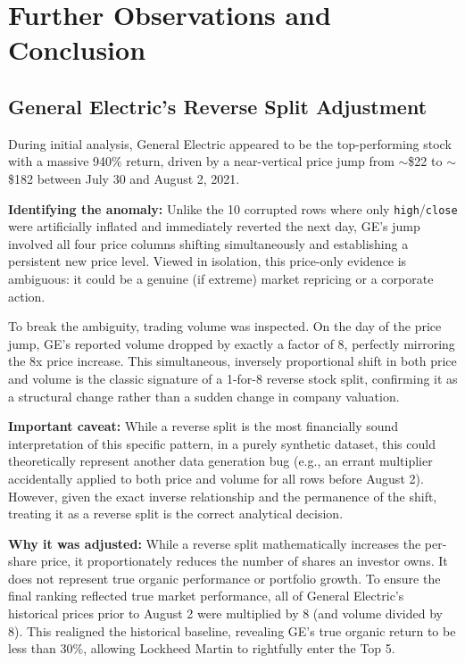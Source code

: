 \chapter{Further Observations and Conclusion}
\label{chap:observations}

\section{General Electric's Reverse Split Adjustment}
\label{sec:ge_jump}

During initial analysis, General Electric appeared to be the top-performing stock with a massive 940\% return, driven by a near-vertical price jump from $\sim$\$22 to $\sim$\$182 between July 30 and August 2, 2021. 

\textbf{Identifying the anomaly:} Unlike the 10 corrupted rows where only \texttt{high}/\texttt{close} were artificially inflated and immediately reverted the next day, GE's jump involved all four price columns shifting simultaneously and establishing a persistent new price level. Viewed in isolation, this price-only evidence is ambiguous: it could be a genuine (if extreme) market repricing or a corporate action. 

To break the ambiguity, trading volume was inspected. On the day of the price jump, GE's reported volume dropped by exactly a factor of 8, perfectly mirroring the 8x price increase. This simultaneous, inversely proportional shift in both price and volume is the classic signature of a 1-for-8 reverse stock split, confirming it as a structural change rather than a sudden change in company valuation.

\textbf{Important caveat:} While a reverse split is the most financially sound interpretation of this specific pattern, in a purely synthetic dataset, this could theoretically represent another data generation bug (e.g., an errant multiplier accidentally applied to both price and volume for all rows before August 2). However, given the exact inverse relationship and the permanence of the shift, treating it as a reverse split is the correct analytical decision.

\textbf{Why it was adjusted:} While a reverse split mathematically increases the per-share price, it proportionately reduces the number of shares an investor owns. It does not represent true organic performance or portfolio growth. To ensure the final ranking reflected true market performance, all of General Electric's historical prices prior to August 2 were multiplied by 8 (and volume divided by 8). This realigned the historical baseline, revealing GE's true organic return to be less than 30\%, allowing Lockheed Martin to rightfully enter the Top 5.


